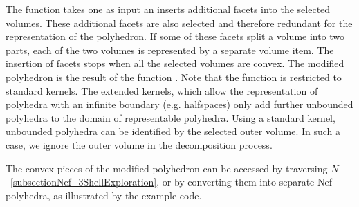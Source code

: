 The function  takes one
 as input an inserts additional facets into the
selected volumes. These additional facets are also selected and
therefore redundant for the representation of the polyhedron. If some
of these facets split a volume into two parts, each of the two volumes
is represented by a separate volume item. The insertion of facets
stops when all the selected volumes are convex. The modified
polyhedron is the result of the function
. Note that the function 
 is restricted to standard kernels. 
The extended kernels, which allow the representation of polyhedra with
an infinite boundary (e.g. halfspaces) only add further unbounded
polyhedra to the domain of representable polyhedra. Using a standard
kernel, unbounded polyhedra can be identified by the selected outer
volume. In such a case, we ignore the outer volume in the
decomposition process.

The convex pieces of the modified polyhedron can be accessed by
traversing $N$~\ref{subsectionNef_3ShellExploration}, or by converting
them into separate Nef polyhedra, as illustrated by the example code.

